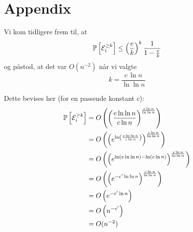 \section{Appendix} \label{sec:appendix}
Vi kom tidligere frem til, at
$$
\mathbb{P} \left[   {\mathcal{E}}_i^{\geq k}   \right] \leq \left( \frac{e}{k} \right)^k \frac{1}{1 - \frac{e}{k}}
$$
og påstod, at det var $O(n^{-2})$ når vi valgte
$$
k = \frac{c \, \ln n}{\ln \ln n}
$$

Dette bevises her (for en passende konstant $c$):
\begin{align*}
  \mathbb{P} \left[   {\mathcal{E}}_i^{\geq k}   \right]
  &= O \left(  \left( \frac{e \ln \ln n}{c \ln n} \right)^{\frac{c \ln n}{\ln \ln n}}  \right)\\
  &= O \left(  \left(  e^{\ln \left( \frac{e \ln \ln n}{c \ln n} \right)}  \right)^{\frac{c \ln n}{\ln \ln n}}  \right)\\
  &= O \left(  \left(  e^{\ln(e \ln \ln n) - \ln (c \ln n)}  \right)^{\frac{c \ln n}{\ln \ln n}}  \right)\\
  &= O \left(  \left(  e^{-c' \ln \ln n}  \right)^{\frac{c \ln n}{\ln \ln n}}  \right)\\
  &= O \left(  e^{- c' \ln n}  \right)\\
  &= O \left(  n^{-c'}  \right)\\
  &= O(n^{-2})
\end{align*}
